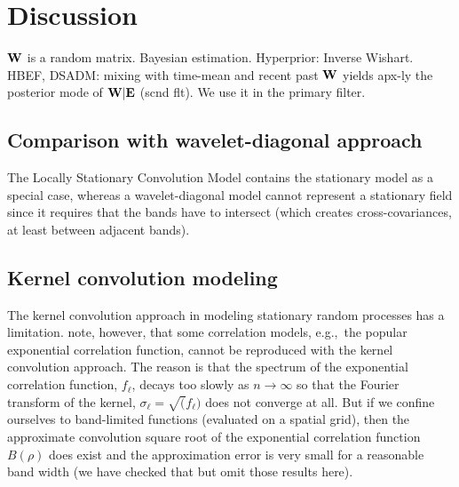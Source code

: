 \documentclass[12pt]{article}
\newcommand{\eg}{e.g.,\ }
\begin{document}
\section{Discussion}
\label{sec_discu}




${\bf W}$ is a random matrix.
Bayesian estimation.
Hyperprior: Inverse Wishart.
HBEF, DSADM: mixing with time-mean and recent past ${\bf W}$ yields apx-ly
the posterior mode of ${\bf W}|{\bf E}$ (scnd flt).
We use it in the primary filter.





\subsection{Comparison with wavelet-diagonal approach}
\label{sec_discu_wvld}






The Locally Stationary Convolution Model contains the stationary model as a special case, whereas a  wavelet-diagonal model cannot 
represent a stationary field since it requires that the bands have to intersect
(which creates cross-covariances, at least between adjacent bands).



\subsection{Kernel convolution modeling}
\label{sec_discu_kernel}



The kernel convolution approach in modeling stationary random processes
has a limitation.
\citet[][section 12.3]{banerjeeCarlinGelfand} %
note, however, that some correlation models, \eg the popular exponential correlation
function, cannot be reproduced with the kernel convolution approach.
The reason is that the spectrum of the exponential correlation
function, $f_\ell$,  decays too slowly as $n \to \infty$ so that the Fourier transform 
of the kernel, $\sigma_\ell = \sqrt(f_\ell)$ does not converge at all. But 
if we confine ourselves to band-limited functions (evaluated on a spatial grid), then
the approximate convolution square root 
of the exponential correlation function $B(\rho)$
does exist and the approximation error is very small for a reasonable band width
(we have checked that but omit those results here). 
\end{document}
